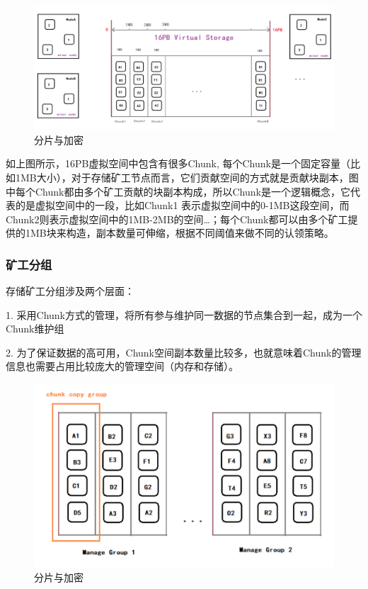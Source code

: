 \documentclass[a4paper,12pt]{article}
\begin{document}
\begin {figure} [htbp]
\centering \includegraphics [width = 5in] {pic_cn/chunk.png}
\caption {分片与加密} \label {fig: d4}
\end {figure}

如上图所示，16PB虚拟空间中包含有很多Chunk, 每个Chunk是一个固定容量（比如1MB大小），对于存储矿工节点而言，它们贡献空间的方式就是贡献块副本，图中每个Chunk都由多个矿工贡献的块副本构成，所以Chunk是一个逻辑概念，它代表的是虚拟空间中的一段，比如Chunk1 表示虚拟空间中的0-1MB这段空间，而Chunk2则表示虚拟空间中的1MB-2MB的空间…；每个Chunk都可以由多个矿工提供的1MB块来构造，副本数量可伸缩，根据不同阈值来做不同的认领策略。

\subsubsection{矿工分组}

存储矿工分组涉及两个层面：

1.	采用Chunk方式的管理，将所有参与维护同一数据的节点集合到一起，成为一个Chunk维护组

2.	为了保证数据的高可用，Chunk空间副本数量比较多，也就意味着Chunk的管理信息也需要占用比较庞大的管理空间（内存和存储）。


\begin {figure} [htbp]
\centering \includegraphics [width = 5in] {pic_cn/chunk_group.png}
\caption {分片与加密} \label {fig: d5}
\end {figure}
\end{document}
